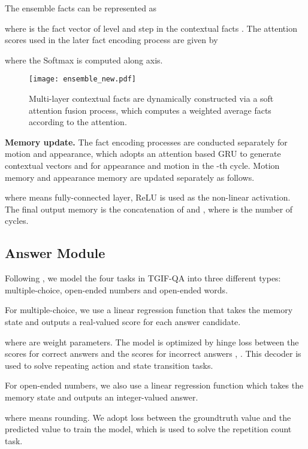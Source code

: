 \documentclass[10pt,twocolumn,letterpaper]{article}
\begin{document}
The ensemble facts can be represented as  
 
where  is the fact vector of level  and step  in the contextual facts . The attention scores used in the later fact encoding process are given by

where the Softmax is computed along  axis.
 
\begin{figure}[]
  \centering
    \texttt{[image: ensemble\_new.pdf]}
    \caption{Multi-layer contextual facts are dynamically constructed via a soft attention fusion process, which computes a weighted average facts according to the attention. }
      \label{fig:ensemble}
\end{figure}

\textbf{Memory update.} The fact encoding processes are conducted separately for motion and appearance, which adopts an attention based GRU \cite{xiong2016dynamic} to generate contextual vectors  and  for appearance and motion in the -th cycle. Motion memory  and appearance memory  are updated separately as follows.




where  means fully-connected layer, ReLU is used as the non-linear activation. The final output memory  is the concatenation of  and , where  is the number of cycles.


\subsection{Answer Module}
Following \cite{Jang_2017_CVPR}, we model the four tasks in TGIF-QA \cite{Jang_2017_CVPR} into three different types: multiple-choice, open-ended numbers and open-ended words. 

For multiple-choice, we use a linear regression function that takes the memory state  and outputs a real-valued score for each answer candidate.

where  are weight parameters. The model is optimized by hinge loss between the scores for correct answers  and the scores for incorrect answers , . This decoder is used to solve repeating action and state transition tasks.

For open-ended numbers, we also use a linear regression function which takes the memory state  and outputs an integer-valued answer.

where  means rounding. We adopt  loss between the groundtruth value and the predicted value to train the model, which is used to solve the repetition count task.
\end{document}

